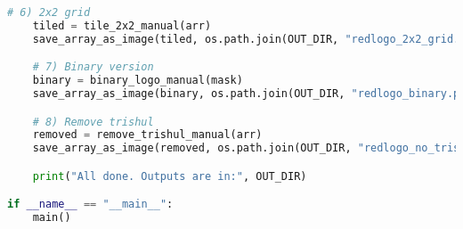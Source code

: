 \documentclass[11pt,a4paper]{article}
\begin{document}
\begin{lstlisting}[language=Python, caption=Manual 2x2 tile snippet]
    # 6) 2x2 grid
    tiled = tile_2x2_manual(arr)
    save_array_as_image(tiled, os.path.join(OUT_DIR, "redlogo_2x2_grid.png"))

    # 7) Binary version
    binary = binary_logo_manual(mask)
    save_array_as_image(binary, os.path.join(OUT_DIR, "redlogo_binary.png"), mode="L")

    # 8) Remove trishul
    removed = remove_trishul_manual(arr)
    save_array_as_image(removed, os.path.join(OUT_DIR, "redlogo_no_trishul.png"))

    print("All done. Outputs are in:", OUT_DIR)

if __name__ == "__main__":
    main()

\end{lstlisting}

\clearpage
\end{document}
